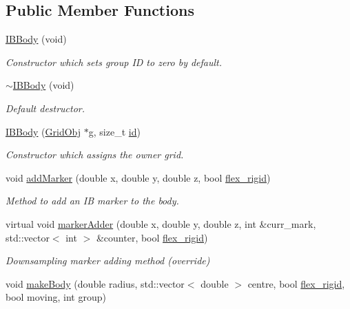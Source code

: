 \subsection*{Public Member Functions}
\begin{DoxyCompactItemize}
\item 
\hyperlink{class_i_b_body_a5fbec47db22b9d525724f232d1d81037}{I\+B\+Body} (void)
\begin{DoxyCompactList}\small\item\em Constructor which sets group ID to zero by default. \end{DoxyCompactList}\item 
\hyperlink{class_i_b_body_afe26e702d31e91f562aecd04a5f5c7f0}{$\sim$\+I\+B\+Body} (void)
\begin{DoxyCompactList}\small\item\em Default destructor. \end{DoxyCompactList}\item 
\hyperlink{class_i_b_body_a737e9f9ecfff9a1ea0741b03a43c3478}{I\+B\+Body} (\hyperlink{class_grid_obj}{Grid\+Obj} $\ast$g, size\+\_\+t \hyperlink{class_body_a9d5166d7419f303190b6c6543e67e815}{id})
\begin{DoxyCompactList}\small\item\em Constructor which assigns the owner grid. \end{DoxyCompactList}\item 
void \hyperlink{class_i_b_body_aafa9573e6787bf3b6f07fd3880452b89}{add\+Marker} (double x, double y, double z, bool \hyperlink{class_i_b_body_a526f3e83b45b991a79941ee745698ea5}{flex\+\_\+rigid})
\begin{DoxyCompactList}\small\item\em Method to add an IB marker to the body. \end{DoxyCompactList}\item 
virtual void \hyperlink{class_i_b_body_a16cf21facacb49727c2e1feda473d080}{marker\+Adder} (double x, double y, double z, int \&curr\+\_\+mark, std\+::vector$<$ int $>$ \&counter, bool \hyperlink{class_i_b_body_a526f3e83b45b991a79941ee745698ea5}{flex\+\_\+rigid})
\begin{DoxyCompactList}\small\item\em Downsampling marker adding method (override) \end{DoxyCompactList}\item 
void \hyperlink{class_i_b_body_af26b0107e612dab7cd1e73bac1f4f234}{make\+Body} (double radius, std\+::vector$<$ double $>$ centre, bool \hyperlink{class_i_b_body_a526f3e83b45b991a79941ee745698ea5}{flex\+\_\+rigid}, bool moving, int group)

\end{DoxyCompactItemize}
